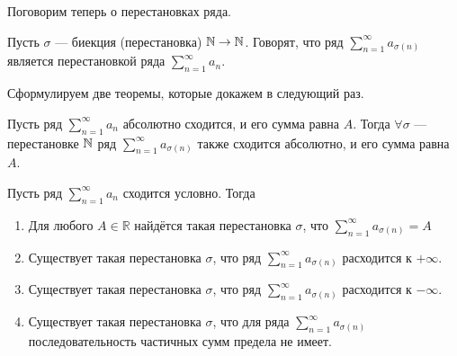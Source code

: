 \documentclass[a4paper, 12pt]{article}
\begin{document}
	Поговорим теперь о перестановках ряда.
	\begin{Def}
		Пусть $\sigma$ --- биекция (перестановка) $\mathbb{N} \to \mathbb{N}$. Говорят, что ряд $\sum\limits_{n=1}^{\infty}a_{\sigma(n)}$ является перестановкой ряда $\sum\limits_{n=1}^{\infty}a_n$.
	\end{Def}
	Сформулируем две теоремы, которые докажем в следующий раз.
	\begin{Theorem}[Коши]
		Пусть ряд $\sum\limits_{n=1}^{\infty}a_n$ абсолютно сходится, и его сумма равна $A$. Тогда $\forall \sigma$ --- перестановке $\mathbb{N}$ ряд $\sum\limits_{n=1}^{\infty}a_{\sigma(n)}$ также сходится абсолютно, и его сумма равна $A$.
	\end{Theorem}
	\begin{Theorem}[Римана]
		Пусть ряд $\sum\limits_{n=1}^{\infty}a_n$ сходится условно. Тогда\\
		\begin{enumerate}
			\item Для любого $A \in \mathbb{R}$ найдётся такая перестановка $\sigma$, что $\sum\limits_{n=1}^{\infty}a_{\sigma(n)} = A $
			\item Существует такая перестановка $\sigma$, что ряд $\sum\limits_{n=1}^{\infty}a_{\sigma(n)}$ расходится к $+\infty$.
			\item Существует такая перестановка $\sigma$, что ряд $\sum\limits_{n=1}^{\infty}a_{\sigma(n)}$ расходится к $-\infty$.
			\item Существует такая перестановка $\sigma$, что для ряда $\sum\limits_{n=1}^{\infty}a_{\sigma(n)}$ последовательность частичных сумм предела не имеет.
		\end{enumerate}
	\end{Theorem}
\end{document}
